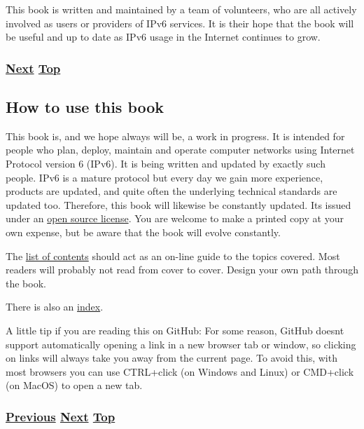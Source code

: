 \documentclass[
]{article}
\begin{document}
This book is written and maintained by a team of volunteers, who are all
actively involved as users or providers of IPv6 services. It is their
hope that the book will be useful and up to date as IPv6 usage in the
Internet continues to grow.

\subsubsection{\texorpdfstring{\hyperref[how-to-use-this-book]{Next}
\hyperref[introduction-and-foreword]{Top}}{Next Top}}\label{next-top}

\pagebreak

\subsection{How to use this book}\label{how-to-use-this-book}

This book is, and we hope always will be, a work in progress. It is
intended for people who plan, deploy, maintain and operate computer
networks using Internet Protocol version 6 (IPv6). It is being written
and updated by exactly such people. IPv6 is a mature protocol but every
day we gain more experience, products are updated, and quite often the
underlying technical standards are updated too. Therefore, this book
will likewise be constantly updated. It\textquotesingle s issued under
an \href{https://github.com/becarpenter/book6/blob/main/LICENSE.md}{open
source license}. You are welcome to make a printed copy at your own
expense, but be aware that the book will evolve constantly.

The \hyperref[list-of-contents]{list of contents} should act as an
on-line guide to the topics covered. Most readers will probably not read
from cover to cover. Design your own path through the book.

There is also an \hyperref[book6-main-index]{index}.

A little tip if you are reading this on GitHub: For some reason, GitHub
doesn\textquotesingle t support automatically opening a link in a new
browser tab or window, so clicking on links will always take you away
from the current page. To avoid this, with most browsers you can use
CTRL+click (on Windows and Linux) or CMD+click (on MacOS) to open a new
tab.

\subsubsection{\texorpdfstring{\hyperref[foreword]{Previous}
\hyperref[how-a-user-sees-ipv6]{Next}
\hyperref[introduction-and-foreword]{Top}}{Previous Next Top}}\label{previous-next-top}
\end{document}
